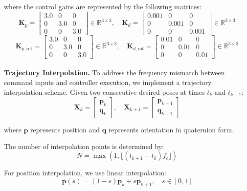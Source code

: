 \noindent where the control gains are represented by the following  matrices:
\[
    \mathbf{K}_p = \begin{bmatrix} 
        3.0 & 0 & 0 \\
        0 & 3.0 & 0 \\
        0 & 0 & 3.0
    \end{bmatrix} \in \mathbb{R}^{3 \times 3}, \quad
    \mathbf{K}_d = \begin{bmatrix}
        0.001 & 0 & 0 \\
        0 & 0.001 & 0 \\
        0 & 0 & 0.001
    \end{bmatrix} \in \mathbb{R}^{3 \times 3}
\]
\[
    \mathbf{K}_{p,\text{rot}} = \begin{bmatrix}
        3.0 & 0 & 0 \\
        0 & 3.0 & 0 \\
        0 & 0 & 3.0
    \end{bmatrix} \in \mathbb{R}^{3 \times 3}, \quad
    \mathbf{K}_{d,\text{rot}} = \begin{bmatrix}
        0.01 & 0 & 0 \\
        0 & 0.01 & 0 \\
        0 & 0 & 0.01
    \end{bmatrix} \in \mathbb{R}^{3 \times 3}
\]
\\
\noindent \textbf{Trajectory Interpolation.} To address the frequency mismatch between command inputs and controller execution, we implement a trajectory interpolation scheme. Given two consecutive desired poses at times $t_k$ and $t_{k+1}$:
\[
    \mathbf{X}_k = \begin{bmatrix} \mathbf{p}_k \\ \mathbf{q}_k \end{bmatrix}, \quad \mathbf{X}_{k+1} = \begin{bmatrix} \mathbf{p}_{k+1} \\ \mathbf{q}_{k+1} \end{bmatrix}
\]

\noindent where $\mathbf{p}$ represents position and $\mathbf{q}$ represents orientation in quaternion form. 

\noindent The number of interpolation points is determined by:
\[
    N = \max(1, \lfloor (t_{k+1} - t_k) f_c \rfloor)
\]

\noindent For position interpolation, we use linear interpolation:
\[
    \mathbf{p}(s) = (1-s)\mathbf{p}_k + s\mathbf{p}_{k+1}, \quad s \in [0,1]
\]

